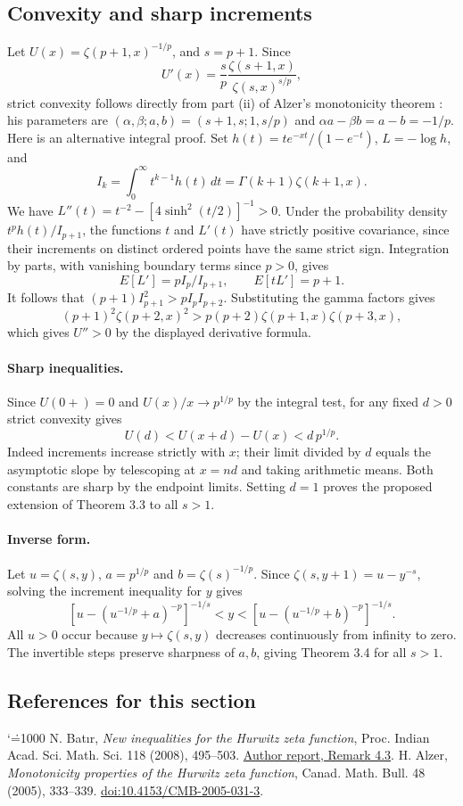 \documentclass[11pt,a4paper]{article}
\makeatletter
\numberwithin{equation}{section}
\theoremstyle{definition}
\theoremstyle{remark}
\renewenvironment{thebibliography}[1]
 {\subsection*{References for this section}\small
  \list{\@biblabel{\@arabic\c@enumiv}}
       {\settowidth\labelwidth{\@biblabel{#1}}\leftmargin\labelwidth
        \advance\leftmargin\labelsep\@openbib@code
        \usecounter{enumiv}\let\p@enumiv\@empty
        \renewcommand\theenumiv{\@arabic\c@enumiv}}
  \sloppy\clubpenalty4000\widowpenalty4000\sfcode`\.=1000\relax}
 {\def\@noitemerr{\@latex@warning{Empty bibliography}}\endlist}
\makeatother
\begin{document}
\subsection{Convexity and sharp increments}
Let $U(x)=\zeta(p+1,x)^{-1/p}$, and $s=p+1$. Since
\[
 U'(x)=\frac{s}{p}\frac{\zeta(s+1,x)}{\zeta(s,x)^{s/p}},
\]
strict convexity follows directly from part (ii) of Alzer's monotonicity theorem \cite{r31meiji:A}: his parameters are $(\alpha,\beta;a,b)=(s+1,s;1,s/p)$ and $\alpha a-\beta b=a-b=-1/p$. Here is an alternative integral proof.
Set $h(t)=t e^{-xt}/(1-e^{-t})$, $L=-\log h$, and
\[
 I_k=\int_0^\infty t^{k-1}h(t)\,dt=\Gamma(k+1)\zeta(k+1,x).
\]
We have $L''(t)=t^{-2}-[4\sinh^2(t/2)]^{-1}>0$. Under the probability density $t^ph(t)/I_{p+1}$, the functions $t$ and $L'(t)$ have strictly positive covariance, since their increments on distinct ordered points have the same strict sign. Integration by parts, with vanishing boundary terms since $p>0$, gives
\[
 E[L']=p I_p/I_{p+1},\qquad E[tL']=p+1.
\]
It follows that $(p+1)I_{p+1}^2>pI_p I_{p+2}$. Substituting the gamma factors gives
\[
 (p+1)^2\zeta(p+2,x)^2>p(p+2)\zeta(p+1,x)\zeta(p+3,x),
\]
which gives $U''>0$ by the displayed derivative formula.
\paragraph{Sharp inequalities.} Since $U(0+)=0$ and $U(x)/x\to p^{1/p}$ by the integral test, for any fixed $d>0$ strict convexity gives
\[
 U(d)< U(x+d)-U(x)<d\,p^{1/p}.
\]
Indeed increments increase strictly with $x$; their limit divided by $d$ equals the asymptotic slope by telescoping at $x=nd$ and taking arithmetic means. Both constants are sharp by the endpoint limits. Setting $d=1$ proves the proposed extension of Theorem 3.3 to all $s>1$.
\paragraph{Inverse form.} Let $u=\zeta(s,y)$, $a=p^{1/p}$ and $b=\zeta(s)^{-1/p}$. Since $\zeta(s,y+1)=u-y^{-s}$, solving the increment inequality for $y$ gives
\[
 [u-(u^{-1/p}+a)^{-p}]^{-1/s}<y<
 [u-(u^{-1/p}+b)^{-p}]^{-1/s}.
\]
All $u>0$ occur because $y\mapsto\zeta(s,y)$ decreases continuously from infinity to zero. The invertible steps preserve sharpness of $a,b$, giving Theorem 3.4 for all $s>1$.
\begin{thebibliography}{9}
 N. Bat\i r, \emph{New inequalities for the Hurwitz zeta function}, Proc. Indian Acad. Sci. Math. Sci. 118 (2008), 495--503. \href{https://rgmia.org/papers/v12n1/Hurwitz-Piac.pdf}{Author report, Remark 4.3}.
 H. Alzer, \emph{Monotonicity properties of the Hurwitz zeta function}, Canad. Math. Bull. 48 (2005), 333--339. \href{https://doi.org/10.4153/CMB-2005-031-3}{doi:10.4153/CMB-2005-031-3}.
\end{thebibliography}
\end{document}
